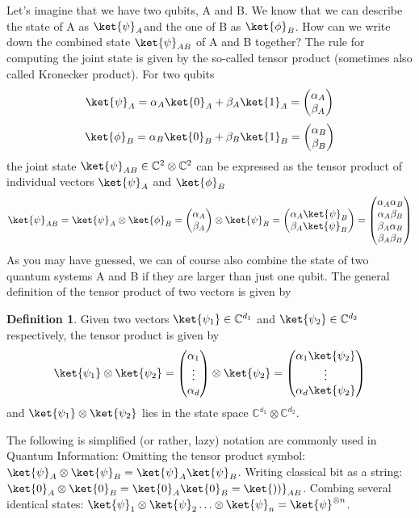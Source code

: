 \documentclass[12pt, oneside]{book}
\theoremstyle{definition}
\newtheorem{definition}{Definition}[section]
\theoremstyle{definition}
\theoremstyle{remark}
\begin{document}
Let’s imagine that we have two qubits, A and B. We know that we can describe the state of A
as $\ket{\psi}_A$and the one of B as $\ket{\phi}_B$. How can we write down the combined state $\ket{\psi}_{AB}$ of A and B together? The rule for computing the joint state is given by the so-called tensor product (sometimes also called Kronecker product). For two qubits
\[
\ket{\psi}_A=\alpha_A\ket{0}_A+\beta_A\ket{1}_A=\begin{pmatrix} \alpha_A \\ \beta_A \end{pmatrix}
\]
\[
\ket{\phi}_B=\alpha_B\ket{0}_B+\beta_B\ket{1}_B = \begin{pmatrix} \alpha_B \\ \beta_B\end{pmatrix}
\]
the joint state $\ket{\psi}_{AB} \in \mathbb{C}^2 \otimes \mathbb{C}^2$ can be expressed as the tensor product of individual vectors $\ket{\psi}_A$ and $\ket{\phi}_B$
\[
\ket{\psi}_{AB}=\ket{\psi}_A \otimes \ket{\phi}_B = \begin{pmatrix} \alpha_A \\ \beta_A \end{pmatrix} \otimes \ket{\psi}_B = \begin{pmatrix} \alpha_A \ket{\psi}_B \\ \beta_A\ket{\psi}_B \end{pmatrix} = \begin{pmatrix} \alpha_A \alpha_B \\ \alpha_A\beta_B \\ \beta_A\alpha_B\\ \beta_A\beta_B \end{pmatrix}
\]
As you may have guessed, we can of course also combine the state of two quantum systems A and
B if they are larger than just one qubit. The general definition of the tensor product of two vectors is given by
\begin{definition}
    Given two vectors $\ket{\psi_1} \in \mathbb{C}^{d_1}$ and $\ket{\psi_2}\in\mathbb{C}^{d_2}$ respectively, the tensor product is given by
    \[
    \ket{\psi_1}\otimes \ket{\psi_2}  = \begin{pmatrix} \alpha_1 \\ \vdots \\ \alpha_d \end{pmatrix} \otimes \ket{\psi_2} = \begin{pmatrix} \alpha_1\ket{\psi_2} \\ \vdots \\ \alpha_d\ket{\psi_2} \end{pmatrix}
    \]
    and $\ket{\psi_1}\otimes \ket{\psi_2}$ lies in the state space $\mathbb{C^{d_1}} \otimes \mathbb{C}^{d_2}$.
\end{definition}
The following is simplified (or rather, lazy) notation are commonly used in Quantum Information:
Omitting the tensor product symbol: $\ket{\psi}_A \otimes \ket{\psi}_B  =\ket{\psi}_A\ket{\psi}_B$. Writing classical bit as a string: $\ket{0}_A\otimes \ket{0}_B=\ket{0}_A\ket{0}_B=\ket{))}_{AB}$. Combing several identical states: $\ket{\psi}_1\otimes \ket{\psi}_2\ldots\otimes \ket{\psi}_n=\ket{\psi}^{\otimes n}$.
\end{document}
